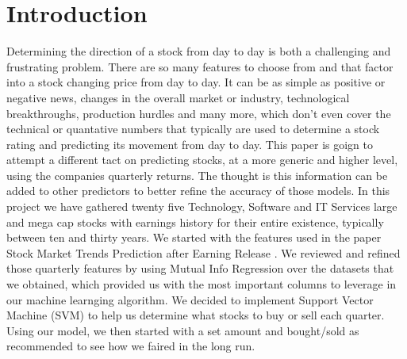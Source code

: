 \documentclass[conference]{IEEEtran}
\begin{document}
\section{Introduction}
Determining the direction of a stock from day to day is both a challenging and frustrating problem.  There are so many features to choose from and that factor into a stock changing price from day to day. It can be as simple as positive or negative news, changes in the overall market or industry, technological breakthroughs, production hurdles and many more, which don't even cover the technical or quantative numbers that typically are used to determine a stock rating and predicting its movement from day to day.  This paper is goign to attempt a different tact on predicting stocks, at a more generic and higher level, using the companies quarterly returns.  The thought is this information can be added to other predictors to better refine the accuracy of those models.  In this project we have gathered twenty five Technology, Software and IT Services large and mega cap stocks with earnings history for their entire existence, typically between ten and thirty years.  We started with the features used in the paper Stock Market Trends Prediction after Earning Release  \cite{QuarterlyPrediction}.  We reviewed and refined those quarterly features by using Mutual Info Regression over the datasets that we obtained, which provided us with the most important columns to leverage in our machine learnging algorithm.  We decided to implement Support Vector Machine (SVM) to help us determine what stocks to buy or sell each quarter.  Using our model, we then started with a set amount and bought/sold as recommended to see how we faired in the long run.
\end{document}
